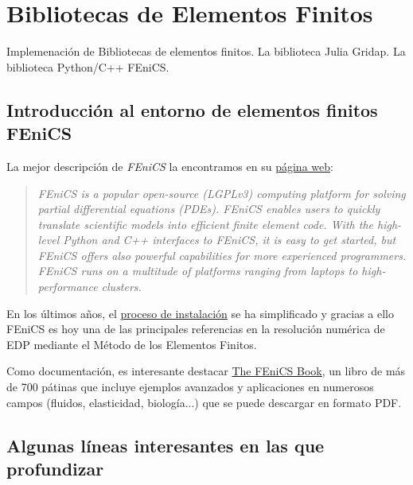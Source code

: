 \section{Bibliotecas de Elementos Finitos}

\begin{contenidos}
Implemenación de Bibliotecas de elementos finitos.
La biblioteca Julia Gridap. La biblioteca Python/C++ FEniCS.
\end{contenidos}


\subsection{Introducción al entorno de elementos finitos FEniCS}

\label{sec:FEniCS}
La mejor descripción de \textit{FEniCS} la encontramos en su \href{https://fenicsproject.org/}{página web}:
\begin{quote}
  \it FEniCS is a popular open-source (LGPLv3) computing platform for solving partial differential equations (PDEs). FEniCS enables users to quickly translate scientific models into efficient finite element code. With the high-level Python and C++ interfaces to FEniCS, it is easy to get started, but FEniCS offers also powerful capabilities for more experienced programmers. FEniCS runs on a multitude of platforms ranging from laptops to high-performance clusters.
\end{quote}

En los últimos años, el
\href{https://fenicsproject.org/download/}{proceso de instalación} se
ha simplificado y gracias a ello FEniCS es hoy una de las principales
referencias en la resolución numérica de EDP mediante el Método de los
Elementos Finitos.

Como documentación, es interesante destacar
\href{https://fenicsproject.org/book/}{The FEniCS Book}, un libro de
más de 700 pátinas que incluye ejemplos avanzados y aplicaciones en
numerosos campos (fluidos, elasticidad, biología...) que se puede
descargar en formato PDF.



\subsection{Algunas líneas interesantes en las que profundizar}
\label{sec:01:profundizar}

